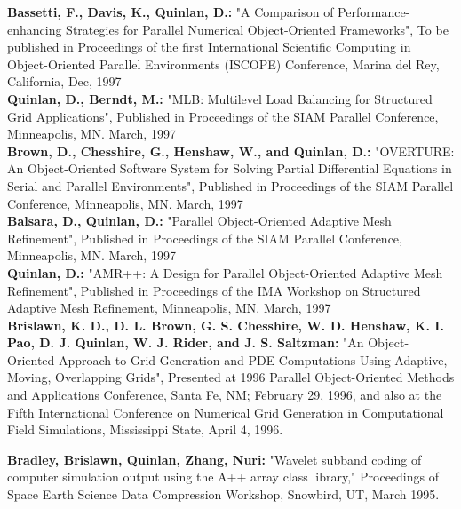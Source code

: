 \begin{thebibliography}{WW}
\small


\vspace {0.5 in}
{\bf Bassetti, F., Davis, K., Quinlan, D.:}
"A Comparison of Performance-enhancing Strategies for Parallel
Numerical Object-Oriented Frameworks",
To be published in Proceedings of the first International Scientific Computing in Object-Oriented
Parallel Environments (ISCOPE) Conference, Marina del Rey, California, Dec, 1997 \\
 
{\bf Quinlan, D., Berndt, M.:}
"MLB: Multilevel Load Balancing for Structured Grid Applications",
Published in Proceedings of the SIAM Parallel Conference, Minneapolis, MN. March, 1997 \\
 
{\bf Brown, D., Chesshire, G., Henshaw, W., and Quinlan, D.:}
"OVERTURE: An Object-Oriented Software System for Solving Partial
Differential Equations in Serial and Parallel Environments",
Published in Proceedings of the SIAM Parallel Conference, Minneapolis, MN. March, 1997 \\
 
{\bf Balsara, D., Quinlan, D.:}
"Parallel Object-Oriented Adaptive Mesh Refinement",
Published in Proceedings of the SIAM Parallel Conference, Minneapolis, MN. March, 1997 \\
 
 {\bf Quinlan, D.:}
"AMR++: A Design for Parallel Object-Oriented Adaptive Mesh Refinement",
Published in Proceedings of the IMA Workshop on Structured Adaptive Mesh
Refinement, Minneapolis, MN. March, 1997 \\
 
  {\bf Brislawn, K. D., D. L. Brown, G. S. Chesshire, W. D. Henshaw, K. I. Pao, D.
J. Quinlan, W. J. Rider, and J. S. Saltzman:}
"An Object-Oriented Approach to
Grid Generation and PDE Computations Using Adaptive, Moving, Overlapping
Grids",  Presented at 1996 Parallel Object-Oriented Methods and Applications
Conference, Santa Fe, NM; February 29, 1996, and also at the Fifth International
Conference on Numerical Grid Generation in Computational Field Simulations, Mississippi State,
April 4, 1996.
 
   {\bf Bradley, Brislawn, Quinlan, Zhang, Nuri:}
  "Wavelet subband coding of computer simulation output using the A++ array class library,"
   Proceedings of Space Earth Science Data Compression Workshop, Snowbird, UT, March 1995.
 

\end{thebibliography}
